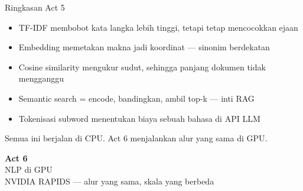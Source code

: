 \documentclass[aspectratio=169,t]{beamer}
\newcommand{\acttitle}[3]{%
  \begin{frame}[plain]
    \vspace{1.5cm}
    \begin{center}
      {\color{nvgreen}\Huge\bfseries Act #1}\\[1.2em]
      {\color{nvwhite}\Huge #2}\\[0.8em]
      {\color{nvgray}\Large #3}
    \end{center}
  \end{frame}%
}
\begin{document}
\begin{frame}{Ringkasan Act 5}
  \begin{itemize}
    \item[\textcolor{nvgreen}{\checkmark}] TF-IDF membobot kata langka lebih tinggi, tetapi tetap mencocokkan ejaan
    \item[\textcolor{nvgreen}{\checkmark}] Embedding memetakan makna jadi koordinat --- sinonim berdekatan
    \item[\textcolor{nvgreen}{\checkmark}] Cosine similarity mengukur sudut, sehingga panjang dokumen tidak mengganggu
    \item[\textcolor{nvgreen}{\checkmark}] Semantic search = encode, bandingkan, ambil top-k --- inti RAG
    \item[\textcolor{nvgreen}{\checkmark}] Tokenisasi subword menentukan biaya sebuah bahasa di API LLM
  \end{itemize}
  \vspace{0.9em}
  \begin{center}
    {\color{nvlightgreen}\small Semua ini berjalan di CPU. Act 6 menjalankan alur yang sama di GPU.}
  \end{center}
\end{frame}

\acttitle{6}{NLP di GPU}{NVIDIA RAPIDS --- alur yang sama, skala yang berbeda}
\end{document}
